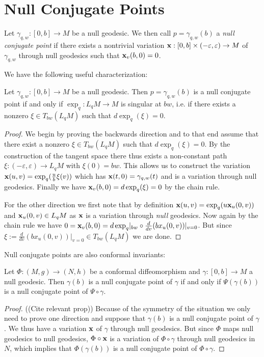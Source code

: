 \section{Null Conjugate Points}

\begin{definition}
    Let $\gamma_{q,w}:[0,b]\to M$ be a null geodesic. We then call $p=\gamma_{q,w}(b)$ a \emph{null conjugate point} if there exists a nontrivial variation $\mathbf{x}:[0,b]\times(-\varepsilon,\varepsilon) \to M$ of $\gamma_{q,w}$ through null geodesics such that $\mathbf{x}_v(b,0)=0$.
\end{definition}

We have the following useful characterization:
\begin{proposition}
    Let $\gamma_{q,w}:[0,b]\to M$ be a null geodesic. Then $p=\gamma_{q,w}(b)$ is a null conjugate point if and only if $\exp_q:L_qM\to M$ is singular at $bw$, i.e. if there exists a nonzero $\xi\in T_{bw}(L_qM)$ such that $d\exp_q(\xi)=0$.
\end{proposition}
\begin{proof}
    We begin by proving the backwards direction and to that end assume that there exist a nonzero $\xi\in T_{bw}(L_qM)$ such that $d\exp_q(\xi)=0$. By the construction of the tangent space there thus exists a non-constant path $\xi:(-\varepsilon,\varepsilon)\to L_qM$ with $\xi(0)=bw$. This allows us to construct the variation $\mathbf{x}(u,v)=\exp_q(\frac{u}{b}\xi(v))$ which has $\mathbf{x}(t,0)=\gamma_{q,w}(t)$ and is a variation through null geodesics. Finally we have $\mathbf{x}_v(b,0)=d\exp_q(\xi)=0$ by the chain rule.

    For the other direction we first note that by definition $\mathbf{x}(u,v)=\exp_q(u\mathbf{x}_u(0,v))$ and $\mathbf{x}_u(0,v)\in L_qM$ as $\mathbf{x}$ is a variation through \emph{null} geodesics. 
    Now again by the chain rule we have $0=\mathbf{x}_v(b,0) = d\exp_q\rvert_{bw} \circ \frac{d}{dv}(bx_u(0,v))\rvert_{v=0}$. But since $\xi := \frac{d}{dv}(bx_u(0,v))\rvert_{v=0} \in T_{bw}(L_qM)$ we are done.
\end{proof}

Null conjugate points are also conformal invariants:
\begin{proposition}
    Let $\Phi:(M,g)\to (N,h)$ be a conformal diffeomorphism and $\gamma:[0,b]\to M$ a null geodesic. Then $\gamma(b)$ is a null conjugate point of $\gamma$ if and only if $\Psi(\gamma(b))$ is a null conjugate point of $\Psi \circ \gamma$.
\end{proposition}
\begin{proof}
    ((Cite relevant prop))
    Because of the symmetry of the situation we only need to prove one direction and suppose that $\gamma(b)$ is a null conjugate point of $\gamma$. We thus have a variation $\mathbf{x}$ of $\gamma$ through null geodesics. But since $\Phi$ maps null geodesics to null geodesics, $\Phi\circ \mathbf{x}$ is a variation of $\Phi \circ \gamma$ through null geodesics in $N$, which implies that $\Phi(\gamma(b))$ is a null conjugate point of $\Phi \circ \gamma$.
\end{proof}

